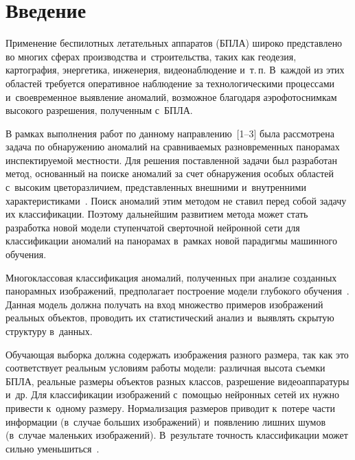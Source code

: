   
\vspace*{6pt}



\thispagestyle{headings}

\begin{multicols}{2}

\label{st\stat}

\section{Введение}

\vspace*{-4pt}

  Применение беспилотных летательных аппаратов (БПЛА) широко 
пред\-став\-ле\-но во многих сферах производства и~строительства, таких как 
геодезия, картография, энергетика, инженерия, видеонаблюдение и~т.\,п. 
В~каж\-дой из этих областей требуется оперативное наблюдение за 
технологическими процессами и~своевременное вы\-яв\-ле\-ние аномалий, 
воз\-мож\-ное благодаря аэрофотоснимкам высокого разрешения, полученным 
с~БПЛА.
  
  В рамках выполнения работ по данному на\-прав\-ле\-нию~[1--3] была 
рассмотрена задача по обнаружению аномалий на сравниваемых 
разновременных панорамах инспектируемой мест\-ности. Для решения 
поставленной задачи был разработан метод, основанный на поиске аномалий за 
счет обнаружения особых областей с~высоким цветоразличием, представленных 
внешними и~внутренними характеристиками~\cite{4-ark, 5-ark}. Поиск 
аномалий этим методом не ставил перед собой задачу их классификации. 
Поэтому дальнейшим развитием метода может стать разработка новой модели 
ступенчатой сверточной нейронной сети для классификации аномалий на 
панорамах в~рамках новой парадигмы машинного обуче\-ния.
  
  Многоклассовая классификация аномалий, полученных при анализе 
созданных панорамных изоб\-ра\-же\-ний, предполагает по\-стро\-ение модели 
глубокого обуче\-ния~\cite{6-ark}. Данная модель должна получать на вход 
множество примеров изоб\-ра\-же\-ний реальных объектов, проводить их 
статистический анализ и~выявлять скры\-тую структуру в~дан\-ных.
{ %

}
  
  Обучающая выборка должна содержать изображения разного размера, так как 
это соответствует реальным условиям работы модели: различная высота съем\-ки 
БПЛА, реальные размеры объектов разных классов, разрешение 
видеоаппаратуры и~др. Для классификации изображений с~по\-мощью 
нейронных сетей их нуж\-но привести к~одному размеру. Нормализация размеров 
приводит к~потере час\-ти информации (в~случае больших изображений) 
и~появлению лишних шумов (в~случае маленьких изображений). В~результате 
точ\-ность классификации может сильно уменьшиться~\cite{7-ark}.


\end{multicols}
